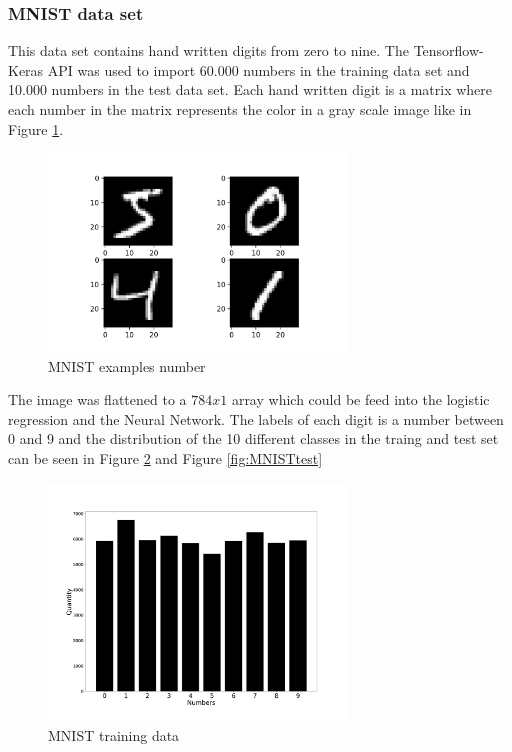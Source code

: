 \documentclass[twocolumn]{cinc}
\begin{document}
\subsubsection{MNIST data set}
This data set contains hand written digits from zero to nine.
The Tensorflow-Keras API \cite{chollet_keras_2015,martin_abadi_tensorflow_2015} was used to import 60.000 numbers in the training data set and 10.000 numbers in the test data set. Each hand written digit is a matrix where each number in the matrix represents the color in a gray scale image like in Figure \ref{fig:MNISTnumbers}.
\begin{figure}[!htb]
\includegraphics[width=7.9cm]{Figures/MNIST_number.png}
\caption{MNIST examples number}
\label{fig:MNISTnumbers}
\end{figure}
The image was flattened to a $784 x 1$ array which could be feed into the logistic regression and the Neural Network. The labels of each digit is a number between 0 and 9 and the distribution of the 10 different classes in the traing and test set can be seen in Figure \ref{fig:MNISTtrain} and Figure \ref{fig:MNISTtest}


\begin{figure}[!htbp]
\includegraphics[width=7.9cm]{Figures/MNIST_train_data.png}
\caption{MNIST training data}
\label{fig:MNISTtrain}
\end{figure}
\end{document}
